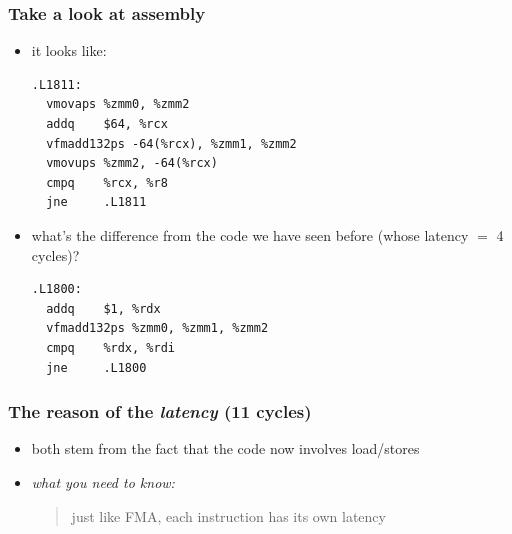 \documentclass[12pt,dvipdfmx]{beamer}
\newcommand{\ao}[1]{{\color{blue}#1}}
\begin{document}
\begin{frame}[fragile]
\frametitle{Take a look at assembly}

\begin{itemize}
\item it looks like:
{\scriptsize
\begin{lstlisting}
.L1811:
  vmovaps %zmm0, %zmm2
  addq    $64, %rcx
  vfmadd132ps -64(%rcx), %zmm1, %zmm2
  vmovups %zmm2, -64(%rcx)
  cmpq    %rcx, %r8
  jne     .L1811
\end{lstlisting}} %

\item what's the difference from the code 
  we have seen before (whose latency $=$ 4 cycles)?

{\scriptsize
\begin{lstlisting}
.L1800:
  addq    $1, %rdx
  vfmadd132ps %zmm0, %zmm1, %zmm2
  cmpq    %rdx, %rdi
  jne     .L1800
\end{lstlisting}} %
\end{itemize}
\end{frame}

\begin{frame}
\frametitle{The reason of the \ao{\em latency} (11 cycles)}
\begin{itemize}
\item both stem from the fact that
  the code now involves load/stores

\item \ao{\it what you need to know:}
  \begin{quote}
  just like FMA, each instruction has its own latency  
  \end{quote}

\end{itemize}
\end{frame}
\end{document}
